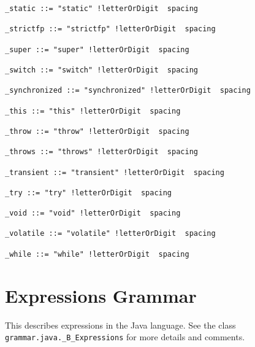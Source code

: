 \begin{lstlisting}[breaklines=true]
_static ::= "static" !letterOrDigit  spacing

_strictfp ::= "strictfp" !letterOrDigit  spacing

_super ::= "super" !letterOrDigit  spacing

_switch ::= "switch" !letterOrDigit  spacing

_synchronized ::= "synchronized" !letterOrDigit  spacing

_this ::= "this" !letterOrDigit  spacing

_throw ::= "throw" !letterOrDigit  spacing

_throws ::= "throws" !letterOrDigit  spacing

_transient ::= "transient" !letterOrDigit  spacing

_try ::= "try" !letterOrDigit  spacing

_void ::= "void" !letterOrDigit  spacing

_volatile ::= "volatile" !letterOrDigit  spacing

_while ::= "while" !letterOrDigit  spacing

\end{lstlisting}

\section{Expressions Grammar}
\label{expressions_grammar}

This describes expressions in the Java language. See the class
\texttt{grammar.java._B_Expressions} for more details and comments.

\hrulefill

